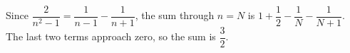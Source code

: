 Since $\dfrac{2}{n^2-1}=\dfrac{1}{n-1}-\dfrac{1}{n+1}$, the sum through $n=N$ is $1+\dfrac{1}{2}-\dfrac{1}{N}-\dfrac{1}{N+1}$. The last two terms approach zero, so the sum is $\boxed{\dfrac{3}{2}}$.
